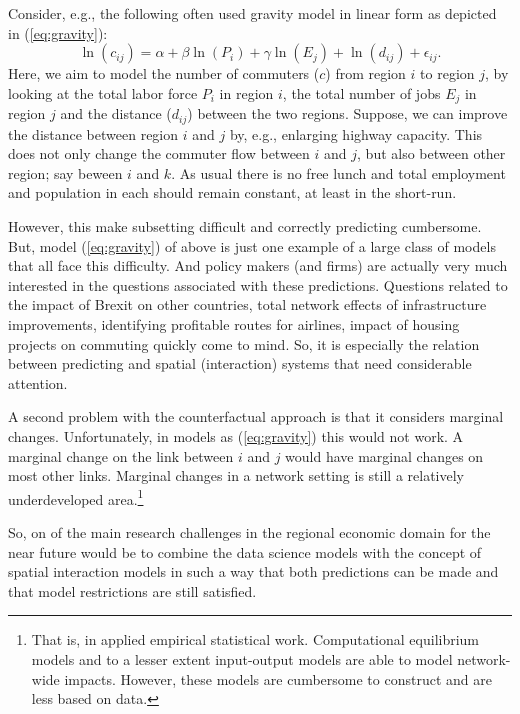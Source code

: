 \documentclass[fleqn,10pt]{SelfArx} %
\begin{document}
Consider, e.g., the following often used gravity model in linear form as
depicted in (\ref{eq:gravity}): 
\begin{equation}
  \label{eq:gravity}
  \ln(c_{ij}) = \alpha + \beta \ln(P_i) + \gamma \ln(E_j) + \ln(d_{ij}) + \epsilon_{ij}.
\end{equation}
Here, we aim to model the number of commuters ($c$) from region $i$ to region
$j$, by looking at the total labor force $P_i$ in region $i$, the total number of
jobs $E_j$ in region $j$ and the distance ($d_{ij}$) between the two regions.
Suppose, we can improve the distance between region $i$ and $j$ by, e.g.,
enlarging highway capacity. This does not only change the commuter flow between
$i$ and $j$, but also between other region; say beween $i$ and $k$. As usual
there is no free lunch and total employment and population in each should remain
constant, at least in the short-run.

However, this make subsetting difficult and correctly predicting cumbersome.
But, model (\ref{eq:gravity}) of above is just one example of a large class of
models that all face this difficulty. And policy makers (and firms) are actually
very much interested in the questions associated with these predictions.
Questions related to the impact of Brexit on other countries, total network
effects of infrastructure improvements, identifying profitable routes for
airlines, impact of housing projects on commuting quickly come to mind. So, it
is especially the relation between predicting and spatial (interaction) systems
that need considerable attention.

A second problem with the counterfactual approach is that it considers marginal
changes. Unfortunately, in models as (\ref{eq:gravity}) this would not work. A
marginal change on the link between $i$ and $j$ would have marginal changes on
most other links. Marginal changes in a network setting is still a relatively
underdeveloped area.\footnote{That is, in applied empirical statistical work.
  Computational equilibrium models and to a lesser extent input-output models
  are able to model network-wide impacts. However, these models are cumbersome
  to construct and are less based on data.}

So, on of the main research challenges in the regional economic domain for the near future would be to combine
the data science models with the concept of spatial interaction models in such a
way that both predictions can be made and that model restrictions are still
satisfied. 
\end{document}
